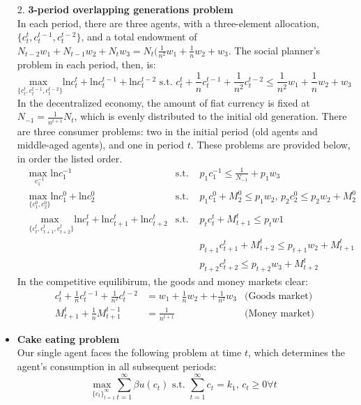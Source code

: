 \documentclass{article}
\begin{document}
\begin{itemize}
	\item[2.] \textbf{3-period overlapping generations problem}
		\medskip \\
		In each period, there are three agents, with a three-element allocation, $\{c_t^{t},c_t^{t-1},c_t^{t-2}\}$, and a total endowment of $N_{t-2}w_1+N_{t-1}w_2+N_tw_3=N_t(\frac{1}{n^2}w_1+\frac{1}{n}w_2+w_3$. The social planner's problem in each period, then, is:
		\[
			\underset{\{c_t^{t},c_t^{t-1},c_t^{t-2}\}}{\text{max }}\text{ln}c_t^{t}+\text{ln}c_t^{t-1}+\text{ln}c_t^{t-2}
				\text{ s.t. }c_t^t + \frac{1}{n}c_t^{t-1} + \frac{1}{n^2}c_t^{t-2} \leq \frac{1}{n^2}w_1+\frac{1}{n}w_2+w_3
		\]
		In the decentralized economy, the amount of fiat currency is fixed at $N_{-1}=\frac{1}{n^{t+1}}N_t$, which is evenly distributed to the initial old generation. There are three consumer problems: two in the initial period (old agents and middle-aged agents), and one in period $t$. These problems are provided below, in order the listed order.
		\begin{align*}
			&\underset{c_1^{-1}}{\text{max }}\text{ln}c_1^{-1}											 
				&\text{s.t. } &p_1c_1^{-1}	\leq \frac{1}{N_{-1}}+p_1w_3 							\\
			&\underset{\{c_1^0,c_2^0\}}{\text{max }}\text{ln}c_1^0+\text{ln}c_2^0						 
				&\text{s.t. } &p_1c_1^0+M_2^0 \leq p_1w_2\text{, }p_2c_2^0\leq p_2w_2 + M_2^0		\\
			&\underset{\{c_t^{t},c_{t+1}^{t},c_{t+2}^t\}}{\text{max }} \text{ln}c_t^{t} + \text{ln}c_{t+1}^{t} + \text{ln}c_{t+2}^{t}
				&\text{s.t. } 	&p_tc_t^t 			+ M^{t}_{t+1}	\leq p_tw1						\\
			&	&				&p_{t+1}c^t_{t+1}	+ M^{t}_{t+2}	\leq p_{t+1}w_2+M^{t}_{t+1}		\\
			&	&				&p_{t+2}c^t_{t+2}					\leq p_{t+2}w_3+M^{t}_{t+2}	
		\end{align*}
		In the competitive equilibirum, the goods and money markets clear:
		\begin{align*}
			c_t^{t}+\frac{1}{n}c_t^{t-1}+\frac{1}{n^2}c_t^{t-2}	&= w_1+\frac{1}{n}w_2++\frac{1}{n^2}w_3	&\text{(Goods market)}	\\
			M_{t+1}^{t}+\frac{1}{n}M_{t+1}^{t-1}				&= \frac{1}{n^{t+1}}					&\text{(Money market)}	
		\end{align*}
		
	\item \textbf{Cake eating problem}
		\medskip \\
		Our single agent faces the following problem at time $t$, which determines the agent's consumption in all subsequent periods:
		\[
			\underset{\{c_t\}_{t=1}^\infty}{\text{max }}\sum_{t=1}^\infty \beta u(c_t) \text{     s.t. }\sum_{t=1}^\infty c_t = k_1\text{, }c_t\geq 0\forall t
		\]
		
\end{itemize}


\end{document}
